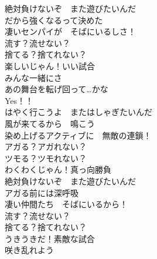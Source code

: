 {絶対負けないぞ　また遊びたいんだ\\
だから強くなるって決めた\\
凄いセンパイが　そばにいるしさ！\\
流す？流せない？\\
捨てる？捨てれない？\\
楽しいじゃん！いい試合\\
みんな一緒にさ\\

あの舞台を転げ回って…かな\\

Yes！！\\
はやく行こうよ　またはしゃぎたいんだ\\
風が来てるから　鳴こう\\
染め上げるアクティブに　無敵の連鎖！\\
アガる？アガれない？\\
ツモる？ツモれない？\\
わくわくじゃん！真っ向勝負\\

絶対負けないぞ　また遊びたいんだ\\
アガる前には深呼吸\\
凄い仲間たち　そばにいるから！\\
流す？流せない？\\
捨てる？捨てれない？\\
うきうきだ！素敵な試合\\
咲き乱れよう
}

